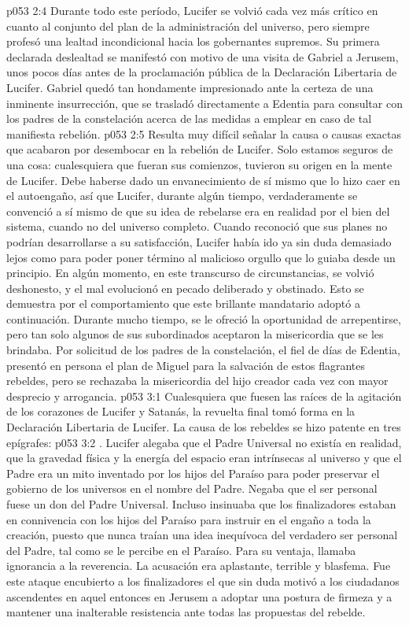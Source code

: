 \vs p053 2:4 Durante todo este período, Lucifer se volvió cada vez más crítico en cuanto al conjunto del plan de la administración del universo, pero siempre profesó una lealtad incondicional hacia los gobernantes supremos. Su primera declarada deslealtad se manifestó con motivo de una visita de Gabriel a Jerusem, unos pocos días antes de la proclamación pública de la Declaración Libertaria de Lucifer. Gabriel quedó tan hondamente impresionado ante la certeza de una inminente insurrección, que se trasladó directamente a Edentia para consultar con los padres de la constelación acerca de las medidas a emplear en caso de tal manifiesta rebelión.
\vs p053 2:5 Resulta muy difícil señalar la causa o causas exactas que acabaron por desembocar en la rebelión de Lucifer. Solo estamos seguros de una cosa: cualesquiera que fueran sus comienzos, tuvieron su origen en la mente de Lucifer. Debe haberse dado un envanecimiento de sí mismo que lo hizo caer en el autoengaño, así que Lucifer, durante algún tiempo, verdaderamente se convenció a sí mismo de que su idea de rebelarse era en realidad por el bien del sistema, cuando no del universo completo. Cuando reconoció que sus planes no podrían desarrollarse a su satisfacción, Lucifer había ido ya sin duda demasiado lejos como para poder poner término al malicioso orgullo que lo guiaba desde un principio. En algún momento, en este transcurso de circunstancias, se volvió deshonesto, y el mal evolucionó en pecado deliberado y obstinado. Esto se demuestra por el comportamiento que este brillante mandatario adoptó a continuación. Durante mucho tiempo, se le ofreció la oportunidad de arrepentirse, pero tan solo algunos de sus subordinados aceptaron la misericordia que se les brindaba. Por solicitud de los padres de la constelación, el fiel de días de Edentia, presentó en persona el plan de Miguel para la salvación de estos flagrantes rebeldes, pero se rechazaba la misericordia del hijo creador cada vez con mayor desprecio y arrogancia.
\vs p053 3:1 Cualesquiera que fuesen las raíces de la agitación de los corazones de Lucifer y Satanás, la revuelta final tomó forma en la Declaración Libertaria de Lucifer. La causa de los rebeldes se hizo patente en tres epígrafes:
\vs p053 3:2 . Lucifer alegaba que el Padre Universal no existía en realidad, que la gravedad física y la energía del espacio eran intrínsecas al universo y que el Padre era un mito inventado por los hijos del Paraíso para poder preservar el gobierno de los universos en el nombre del Padre. Negaba que el ser personal fuese un don del Padre Universal. Incluso insinuaba que los finalizadores estaban en connivencia con los hijos del Paraíso para instruir en el engaño a toda la creación, puesto que nunca traían una idea inequívoca del verdadero ser personal del Padre, tal como se le percibe en el Paraíso. Para su ventaja, llamaba ignorancia a la reverencia. La acusación era aplastante, terrible y blasfema. Fue este ataque encubierto a los finalizadores el que sin duda motivó a los ciudadanos ascendentes en aquel entonces en Jerusem a adoptar una postura de firmeza y a mantener una inalterable resistencia ante todas las propuestas del rebelde.
